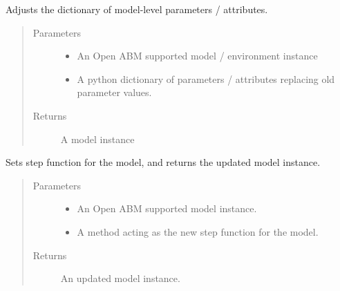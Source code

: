 \documentclass[letterpaper,10pt,english]{sphinxmanual}
\begin{document}

\begin{fulllineitems}
\label{\detokenize{index:oabm_tools.set_model_parameters}}
Adjusts the dictionary of model-level parameters / attributes.
\begin{quote}\begin{description}
\item[{Parameters}] \leavevmode\begin{itemize}
\item {} 
 \textendash{} An Open ABM supported model / environment instance

\item {} 
 \textendash{} A python dictionary of parameters / attributes replacing old parameter values.

\end{itemize}

\item[{Returns}] \leavevmode
A model instance

\end{description}\end{quote}

\end{fulllineitems}


\begin{fulllineitems}
\label{\detokenize{index:oabm_tools.set_model_step}}
Sets step function for the model, and returns the updated model instance.
\begin{quote}\begin{description}
\item[{Parameters}] \leavevmode\begin{itemize}
\item {} 
 \textendash{} An Open ABM supported model instance.

\item {} 
 \textendash{} A method acting as the new step function for the model.

\end{itemize}

\item[{Returns}] \leavevmode
An updated model instance.

\end{description}\end{quote}

\end{fulllineitems}
\end{document}
